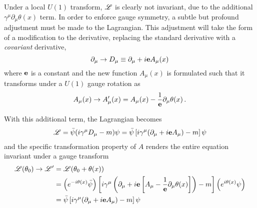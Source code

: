     Under a local $U(1)$ transform, $\mathscr{L}$ is clearly not invariant,
        due to the additional $\gamma^\mu \partial_\mu\theta(x)$ term.
    In order to enforce gauge symmetry, a subtle but profound adjustment must be made to the Lagrangian.
    This adjustment will take the form of a modification to the derivative,
        replacing the standard derivative with a \textit{covariant} derivative,
    \begin{equation}
        \partial_\mu \to D_\mu \equiv \partial_\mu + i \mathbf{e} A_\mu(x)
    \end{equation}
    where $\mathbf{e}$ is a constant and the new function $A_\mu(x)$ is formulated such that it transforms under a $U(1)$ gauge rotation as
    \begin{equation}
        A_\mu(x) \to A'_\mu(x) = A_\mu(x) - \frac{1}{\mathbf{e}} \partial_\mu \theta(x)
        \,.
    \end{equation}

    With this additional term, the Lagrangian becomes
    \begin{equation} \begin{split}
    \mathscr{L} = \bar{\psi} (i\gamma^\mu D_\mu - m) \psi
        = \bar{\psi} \left[i\gamma^\mu(\partial_\mu + i \mathbf{e} A_\mu) - m\right] \psi
    \end{split} \end{equation}
    and the specific transformation property of $A$ renders the entire equation invariant under a gauge transform
    \begin{equation} \begin{split}
    \mathscr{L}(\theta_0) \to \mathscr{L}' &= \mathscr{L}(\theta_0+\theta(x))
        \\&= \left( e^{-i\theta(x)} \bar{\psi} \right) 
        \left[i\gamma^\mu \left(\partial_\mu 
            + i \mathbf{e} \left[A_\mu - \frac{1}{\mathbf{e}} \partial_\mu \theta(x)\right] \right) 
            - m\right]
        \left( e^{i\theta(x)}\psi \right)
        \\&= \bar{\psi} \left[i\gamma^\mu(\partial_\mu + i \mathbf{e} A_\mu) - m\right] \psi
    \end{split} \end{equation}

